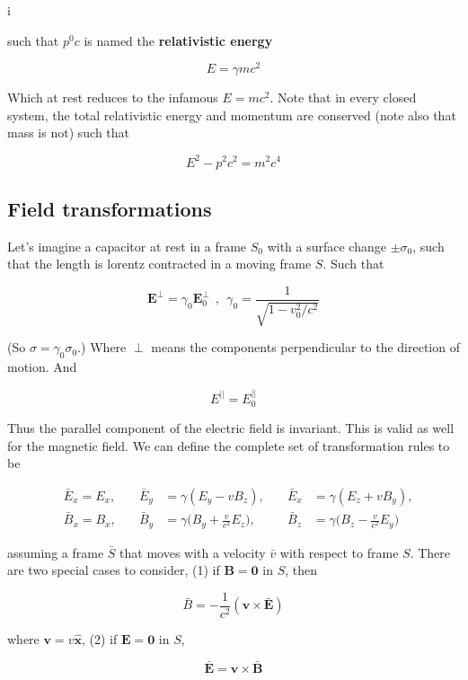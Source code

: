 i\documentclass[a4paper]{article}
\begin{document}
such that $p^0c$ is named the \textbf{relativistic energy}

\begin{equation*}
    E=\gamma mc^2
\end{equation*}

Which at rest reduces to the infamous $E=mc^2$. Note that in every closed system, the total relativistic energy and momentum are conserved (note also that mass is not) such that 

\begin{equation*}
    E^2-p^2c^2=m^2c^4
\end{equation*}

\subsection*{Field transformations}

Let's imagine a capacitor at rest in a frame $S_0$ with a surface change $\pm\sigma_0$, such that the length is lorentz contracted in a moving frame $S$. Such that

\begin{equation*}
    \bm{E}^\perp=\gamma_0\bm{E}_0^\perp\ \ , \ \ \gamma_0=\frac{1}{\sqrt{1-v_0^2/c^2}}
\end{equation*}

(So $\sigma=\gamma_0\sigma_0$.) Where $\perp$ means the components perpendicular to the direction of motion. And

\begin{equation*}
    E^{||}=E_0^{||}
\end{equation*}

Thus the parallel component of the electric field is invariant. This is valid as well for the magnetic field. We can define the complete set of transformation rules to be

\begin{align*}
    &\bar{E}_x=E_x,\quad & \bar{E}_y&=\gamma(E_y-vB_z),\quad                       & \bar{E}_x&=\gamma(E_z+vB_y),\\[1em]
    &\bar{B}_x=B_x,\quad & \bar{B}_y&=\gamma\bigg(B_y+\frac{v}{c^2}E_z\bigg),\quad & \bar{B}_z&=\gamma\bigg(B_z-\frac{v}{c^2}E_y\bigg)
\end{align*}

assuming a frame $\bar{S}$ that moves with a velocity $\bar{v}$ with respect to frame $S$. There are two special cases to consider, (1) if $\bm{B}=\bm{0}$ in $S$, then 

\begin{equation*}
    \bar{B}=-\frac{1}{c^2}(\bm{v}\times\bm{\bar{E}})
\end{equation*}

where $\bm{v}=v\bm{\hat{x}}$, (2) if $\bm{E}=\bm{0}$ in $S$,

\begin{equation*}
    \bm{\bar{E}}=\bm{v}\times\bm{\bar{B}}
\end{equation*}
\end{document}

